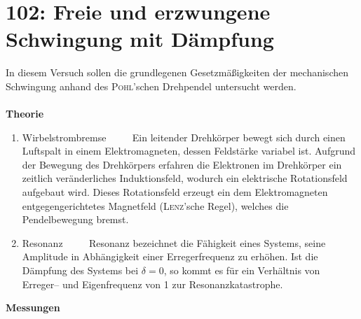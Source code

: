 \section{102: Freie und erzwungene Schwingung mit Dämpfung}
In diesem Versuch sollen die grundlegenen Gesetzmäßigkeiten der mechanischen Schwingung anhand des \textsc{Pohl}'schen Drehpendel untersucht werden.\\\\
\textbf{Theorie} 
\begin{enumerate}[label=--]
        \item Wirbelstrombremse $\qquad $
                Ein leitender Drehkörper bewegt sich durch einen Luftspalt in einem Elektromagneten, dessen Feldstärke variabel ist. 
                Aufgrund der Bewegung des Drehkörpers erfahren die Elektronen im Drehkörper ein zeitlich veränderliches Induktionsfeld, wodurch ein elektrische Rotationsfeld aufgebaut wird. 
                Dieses Rotationsfeld erzeugt ein dem Elektromagneten entgegengerichtetes Magnetfeld (\textsc{Lenz}'sche Regel), welches die Pendelbewegung bremst.
        \item Resonanz $\qquad $ 
                Resonanz bezeichnet die Fähigkeit eines Systems, seine Amplitude in Abhängigkeit einer Erregerfrequenz zu erhöhen.
                Ist die Dämpfung des Systems bei $\delta =0$, so kommt es für ein Verhältnis von Erreger-- und Eigenfrequenz von 1 zur Resonanzkatastrophe.
\end{enumerate}
\textbf{Messungen} 

